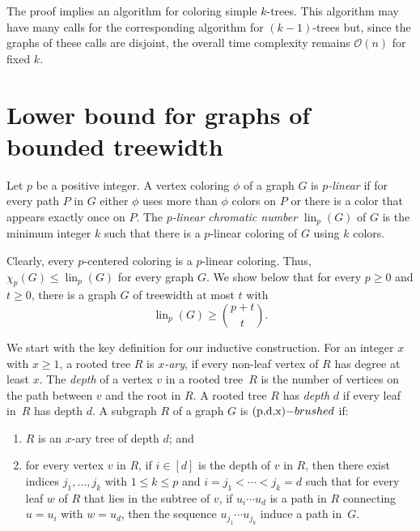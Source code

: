 \documentclass[11pt]{article}
\begin{document}
The proof implies an algorithm for coloring simple $k$-trees. This algorithm
may have many calls for the corresponding algorithm for $(k-1)$-trees but, 
since the graphs of these calls are disjoint, 
the overall time complexity remains $\mathcal{O}(n)$ for fixed $k$.


\section{Lower bound for graphs of bounded treewidth} 
\label{sec-lower-bounds-bounded-tw-linear}


Let $p$ be a positive integer. A vertex coloring $\phi$ of a graph $G$ is
\emph{$p$-linear} if for every path $P$ in $G$ either $\phi$ uses more than
$\phi$ colors on $P$ or there is a color that appears exactly once on $P$.
The \emph{$p$-linear chromatic number} $\operatorname{lin}_p(G)$ of $G$ is the minimum
integer $k$ such that there is a $p$-linear coloring of $G$ using $k$ colors.

Clearly, every $p$-centered coloring is a $p$-linear coloring. 
Thus, $\chi_p(G) \leq \operatorname{lin}_p(G)$ for every graph $G$.
We show below that 
for every $p\geq0$ and $t\geq0$, there is a graph $G$ of treewidth at most $t$ with 
\[
\operatorname{lin}_p(G) \geq \binom{p+t}{t}.
\]

We start with the key definition for our inductive construction.
For an integer $x$ with $x\geq1$, a rooted tree $R$ is \emph{$x$-ary}, 
if every non-leaf vertex of $R$ has degree at least $x$. 
The \emph{depth} of a vertex $v$ in a rooted tree~$R$ %
is the number of vertices on the path between $v$ and the root in $R$.
A rooted tree $R$ has \emph{depth} $d$ if every leaf in~$R$ has depth $d$.
A subgraph $R$ of a graph $G$ is $\emph{$(p,d,x)$-brushed}$ if:
\begin{enumerate}[label=\textup{(\roman*)},ref=\textup{\roman*},nosep]
  \item $R$ is an $x$-ary tree of depth $d$; and
  \item for every vertex $v$ in $R$,
  if $i\in[d]$ is the depth of $v$ in $R$, then
  there exist indices $j_1,\ldots,j_k$ with $1\leq k \leq p$ and $i=j_1 < \cdots < j_k=d$ such that for every leaf $w$ of $R$ that lies in the subtree of $v$, 
  if $u_i\cdots u_d$ is a path in $R$ connecting $u=u_i$ with $w=u_d$, then
  the sequence $u_{j_1}\cdots u_{j_k}$ induce a path in~$G$.
  \label{def-brushed-ii}
\end{enumerate}
\end{document}

